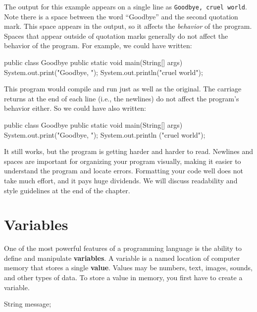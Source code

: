 The output for this example appears on a single line as {\tt Goodbye, cruel world}.
Note there is a space between the word ``Goodbye'' and the second quotation mark.
This space appears in the output, so it affects the {\em behavior} of the program.
Spaces that appear outside of quotation marks generally do not affect the behavior of the program.
For example, we could have written:

\begin{code}
public class Goodbye {
public static void main(String[] args) {
System.out.print("Goodbye, ");
System.out.println("cruel world");
}
}
\end{code}

This program would compile and run just as well as the original.
The carriage returns at the end of each line (i.e., the newlines) do not affect the program's behavior either.
So we could have also written:

\begin{code}
public class Goodbye { public static void main(String[] args) {
System.out.print("Goodbye, "); System.out.println
("cruel world");}}
\end{code}

It still works, but the program is getting harder and harder to read.
Newlines and spaces are important for organizing your program visually, making it easier to understand the program and locate errors.
Formatting your code well does not take much effort, and it pays huge dividends.
We will discuss readability and style guidelines at the end of the chapter.


\section{Variables}


One of the most powerful features of a programming language is the ability to define and manipulate {\bf variables}.
A variable is a named location of computer memory that stores a single {\bf value}.
Values may be numbers, text, images, sounds, and other types of data.
To store a value in memory, you first have to create a variable.

\begin{code}
    String message;
\end{code}


